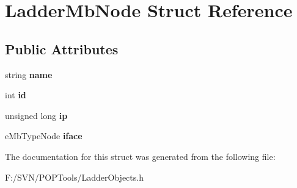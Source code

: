 \hypertarget{struct_ladder_mb_node}{\section{Ladder\-Mb\-Node Struct Reference}
\label{struct_ladder_mb_node}
}
\subsection*{Public Attributes}
\begin{DoxyCompactItemize}
\item 
\hypertarget{struct_ladder_mb_node_a3b663cbcdd500a028204681bd0000859}{string {\bfseries name}}\label{struct_ladder_mb_node_a3b663cbcdd500a028204681bd0000859}

\item 
\hypertarget{struct_ladder_mb_node_a6b91c1f302318f47d7dac2869b400b4e}{int {\bfseries id}}\label{struct_ladder_mb_node_a6b91c1f302318f47d7dac2869b400b4e}

\item 
\hypertarget{struct_ladder_mb_node_a9ce580140e09286e62f065a9b4cde253}{unsigned long {\bfseries ip}}\label{struct_ladder_mb_node_a9ce580140e09286e62f065a9b4cde253}

\item 
\hypertarget{struct_ladder_mb_node_a66e68c54a94d710fbe41fe7432c8297f}{e\-Mb\-Type\-Node {\bfseries iface}}\label{struct_ladder_mb_node_a66e68c54a94d710fbe41fe7432c8297f}

\end{DoxyCompactItemize}


The documentation for this struct was generated from the following file\-:\begin{DoxyCompactItemize}
\item 
F\-:/\-S\-V\-N/\-P\-O\-P\-Tools/Ladder\-Objects.\-h\end{DoxyCompactItemize}
